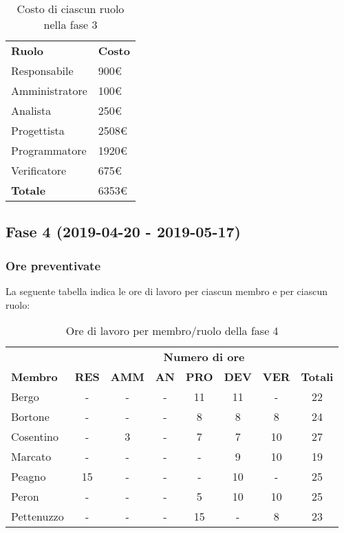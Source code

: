 		\begin{table}[h]
			\centering
			\begin{tabular}{| l | l |}
				\rowcolor{LightBlue}
				\textbf{\color{white}Ruolo}
				& \textbf{\color{white}Costo}\\
				
				Responsabile 		& 900€\\
				Amministratore 	& 100€\\
				Analista 				& 250€\\			
				Progettista 			& 2508€\\
				Programmatore 		& 1920€\\
				Verificatore 		& 675€\\ \hline
				\textbf{Totale} 	& 6353€\\ \hline
			\end{tabular}
			\caption{Costo di ciascun ruolo nella fase 3}
		\end{table}
		
\newpage
\subsection{Fase 4 (2019-04-20 - 2019-05-17)}
	\subsubsection{Ore preventivate}
		La seguente tabella indica le ore di lavoro per ciascun membro e per ciascun ruolo:
		\begin{table}[h]
			\centering
			\begin{tabular}{| l | c c c c c c | c |}
				\rowcolor{LightBlue}
				& \multicolumn{7}{c}{\textbf{\color{white}Numero di ore}}	\\
		
				\rowcolor{LightBlue}
				\textbf{\color{white}Membro}
				& \textbf{\color{white}RES}
				& \textbf{\color{white}AMM}
				& \textbf{\color{white}AN}
				& \textbf{\color{white}PRO}
				& \textbf{\color{white}DEV}
				& \textbf{\color{white}VER}
				& \textbf{\color{white}Totali}\\
	
				Bergo      & - & - & - & 11 & 11 & - & 22\\
				Bortone    & - & - & - & 8 & 8 & 8 & 24\\
				Cosentino  & - & 3 & - & 7 & 7 & 10 & 27\\
				Marcato    & - & - & - & - & 9 & 10 & 19\\
				Peagno     & 15 & - & - & - & 10 & - & 25\\
				Peron      & - & - & - & 5 & 10 & 10 & 25\\
				Pettenuzzo & - & - & - & 15 & - & 8 & 23\\ \hline
			\end{tabular}
			\caption{Ore di lavoro per membro/ruolo della fase 4}
		\end{table}
		
